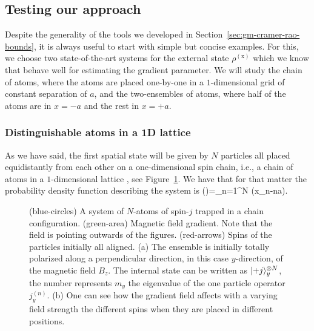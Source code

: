\subsection{Testing our approach}
\label{sec:gm-io-chain-and-two-ensembles}

Despite the generality of the tools we developed in Section~\ref{sec:gm-cramer-rao-bounds}, it is always useful to start with simple but concise examples.
For this, we choose two state-of-the-art systems for the external state $\rho^{(\text{x})}$ which we know that behave well for estimating the gradient parameter.
We will study the chain of atoms, where the atoms are placed one-by-one in a $1$-dimensional grid of constant separation of $a$, and the two-ensembles of atoms, where half of the atoms are in $x=-a$ and the rest in $x=+a$.

\subsubsection{Distinguishable atoms in a 1D lattice}

As we have said, the first spatial state will be given by $N$ particles all placed equidistantly from each other on a one-dimensional spin chain, i.e., a chain of atoms in a $1$-dimensional lattice
\cite{Altenburg2016},
see Figure~\ref{fig:ionchain-evolution}.
We have that for that matter the probability density function describing the system is
\be
  \prob()=\prod_{n=1}^N \delta(x_n-na).
\ee
\begin{figure}[htp]
  \begin{center}
    \caption[1-D chain of atoms polarized along $y$-axis under a gradient magnetic field]{(blue-circles) A system of $N$-atoms of spin-$j$ trapped in a chain configuration.
    (green-area) Magnetic field gradient.
    Note that the field is pointing outwards of the figures.
    (red-arrows) Spins of the particles initially all aligned.
    (a) The ensemble is initially totally polarized along a
    perpendicular direction, in this case $y$-direction, of the magnetic field $B_z$.
    The internal state can be written as $\vert{+j}\rangle_{y}^{\otimes N}$, the number represents $m_y$ the eigenvalue of the one particle operator $j_y^{(n)}$.
    (b) One can see how the gradient field affects with a varying field strength the different spins when they are placed in different positions. }
    \label{fig:ionchain-evolution}
  \end{center}
\end{figure}

